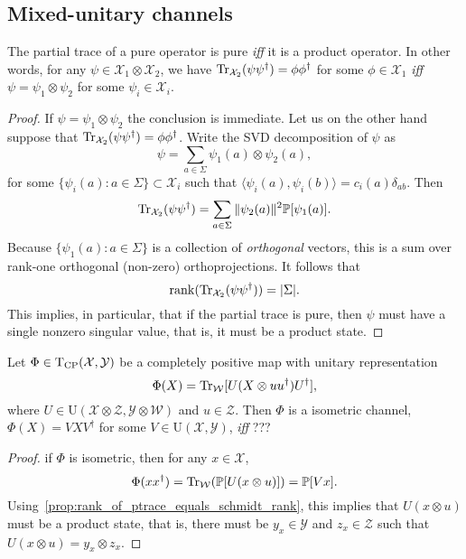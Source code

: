 \documentclass[12pt]{report}
\newcommand{\PP}{\mathbb{P}}
\newcommand{\calY}{{\mathcal{Y}}}
\newcommand{\calW}{{\mathcal{W}}}
\newcommand{\calX}{{\mathcal{X}}}
\newcommand{\calZ}{{\mathcal{Z}}}
\newcommand{\rmT}{{\mathrm{T}}}
\newcommand{\rmU}{{\mathrm{U}}}
\begin{document}
\subsection{Mixed-unitary channels}

\begin{prop}\label{prop:rank_of_ptrace_equals_schmidt_rank}
	The partial trace of a pure operator is pure \emph{iff} it is a product operator.
	In other words, for any $\psi\in\calX_1\otimes\calX_2$, we have
	$\Tr_{\calX_2}(\psi\psi^\dagger)=\phi\phi^\dagger$ for some $\phi\in\calX_1$ \emph{iff} $\psi=\psi_1\otimes\psi_2$ for some $\psi_i\in\calX_i$.
\end{prop}
\begin{proof}
	If $\psi=\psi_1\otimes\psi_2$ the conclusion is immediate.
	Let us on the other hand suppose that
	$\Tr_{\calX_2}(\psi\psi^\dagger)=\phi\phi^\dagger$.
	Write the SVD decomposition of $\psi$ as
	\begin{equation}
		\psi = \sum_{a\in\Sigma} \psi_1(a)\otimes\psi_2(a),
	\end{equation}
	for some $\{\psi_i(a): a\in\Sigma\}\subset\calX_i$ such that
	$\langle \psi_i(a),\psi_i(b)\rangle = c_i(a) \delta_{ab}$.
	Then
	\begin{equation}
		\Tr_{\calX_2}(\psi\psi^\dagger)
		= \sum_{a\in\Sigma} \|\psi_2(a)\|^2 \PP[\psi_1(a)].
	\end{equation}
	Because $\{\psi_1(a):a\in\Sigma\}$ is a collection of \emph{orthogonal} vectors, this is a sum over rank-one orthogonal (non-zero) orthoprojections.
	It follows that
	\begin{equation}
		\rank(\Tr_{\calX_2}(\psi\psi^\dagger)) = \lvert\Sigma\rvert.
	\end{equation}
	This implies, in particular, that if the partial trace is pure, then $\psi$ must have a single nonzero singular value, that is, it must be a product state.
\end{proof}

\begin{prop}
	Let $\Phi\in\rmT_{\rm CP}(\calX,\calY)$ be a completely positive map with unitary representation
	\begin{equation}
		\Phi(X) = \Tr_\calW[U(X\otimes uu^\dagger)U^\dagger],
	\end{equation}
	where $U\in\rmU(\calX\otimes\calZ,\calY\otimes\calW)$ and $u\in\calZ$.
	Then $\Phi$ is a isometric channel, $\Phi(X)=VXV^\dagger$ for some $V\in\rmU(\calX,\calY)$, \emph{iff} ???
\end{prop}
\begin{proof}
	if $\Phi$ is isometric, then for any $x\in\calX$,
	\begin{equation}
		\Phi(xx^\dagger) = \Tr_\calW(\PP[U(x\otimes u)])
		= \PP[V x].
	\end{equation}
	Using~\cref{prop:rank_of_ptrace_equals_schmidt_rank}, this implies that $U(x\otimes u)$ must be a product state, that is, there must be $y_x\in\calY$ and $z_x\in\calZ$ such that $U(x\otimes u)=y_x\otimes z_x$.
\end{proof}
\end{document}
